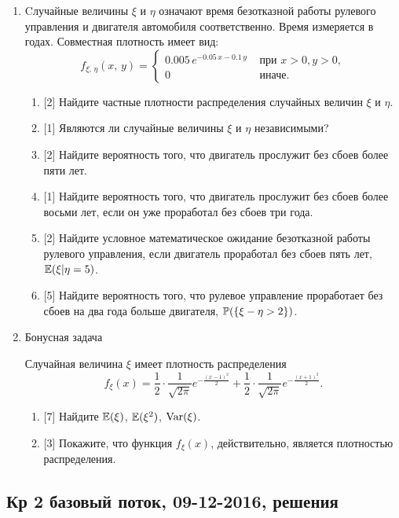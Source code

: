 \documentclass[12pt, a4paper]{article}\usepackage[]{graphicx}\usepackage[]{color}
\begin{document}
\begin{enumerate}
\newpage
\item
Cлучайные величины $\xi$ и $\eta$ означают время безотказной работы рулевого управления и двигателя автомобиля соответственно. Время измеряется в годах. Совместная плотность имеет вид:
\[
f_{\xi, \,\eta}(x,\,y) =
\begin{cases}
0.005\,e^{-0.05\,x-0.1\,y} & \text{ при } x > 0, y > 0, \\
0                    & \text{ иначе.}
\end{cases}
\]

\begin{enumerate}
  \item{} [2] Найдите частные плотности распределения случайных величин $\xi$ и $\eta$.
  \item{} [1] Являются ли случайные величины $\xi$ и $\eta$ независимыми?
  \item{} [2] Найдите вероятность того, что двигатель прослужит без сбоев более пяти лет.
  \item{} [1] Найдите вероятность того, что двигатель прослужит без сбоев более восьми лет, если он уже проработал без сбоев три года.
  \item{} [2] Найдите условное математическое ожидание безотказной работы рулевого управления, если двигатель проработал без сбоев пять лет,  $\E(\xi | \eta = 5)$.
  \item{} [5] Найдите вероятность того, что рулевое управление проработает без сбоев на два года больше двигателя,  $\P(\{\xi - \eta > 2\})$.
\end{enumerate}

\item Бонусная задача

Случайная величина $\xi$ имеет плотность распределения
\[
    f_{\xi}(x) = \frac{1}{2} \cdot \frac{1}{\sqrt{2\pi}}e^{-\frac{(x-1)^2}{2}} + \frac{1}{2} \cdot \frac{1}{\sqrt{2\pi}}e^{-\frac{(x+1)^2}{2}} \text{.}
\]

\begin{enumerate}
\item{} [7] Найдите $\E(\xi)$, $\E(\xi^2)$, $\Var(\xi)$.
\item{} [3] Покажите, что функция $f_{\xi}(x)$, действительно, является плотностью распределения.
\end{enumerate}


\end{enumerate}



						\subsection{Кр 2 базовый поток, 09-12-2016, решения}
\end{document}
